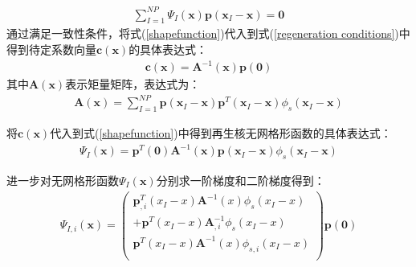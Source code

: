 \begin{equation}\label{regeneration conditions}
\begin{split}
    \sum_{I=1}^{N\!P}\Psi_I(\pmb{x})\pmb{p}(\pmb{x}_I-\pmb{x})=\pmb{0}
\end{split}
\end{equation}
通过满足一致性条件，将式(\ref{shapefunction})代入到式(\ref{regeneration conditions})中得到待定系数向量$\pmb{c}(\pmb{x})$的具体表达式：
\begin{equation}
\begin{split}
    \pmb{c}(\pmb{x})=\pmb{A}^{-1}(\pmb{x})\pmb{p}(\pmb{0})
\end{split}
\end{equation}
其中$\pmb{A}(\pmb{x})$表示矩量矩阵，表达式为：
\begin{equation}
\begin{split}
    \pmb{A}(\pmb{x})=\sum_{I=1}^{N\!P}\pmb{p}(\pmb{x}_I-\pmb{x})\pmb{p}^T(\pmb{x}_I-\pmb{x})\phi_s(\pmb{x}_I-\pmb{x})
\end{split}
\end{equation}\par
将$\pmb{c}(\pmb{x})$代入到式(\ref{shapefunction})中得到再生核无网格形函数的具体表达式：
\begin{equation}\label{Pshapefunction}
\begin{split}
    \Psi_I(\pmb{x})=\pmb{p}^T(\pmb{0})\pmb{A}^{-1}(\pmb{x})\pmb{p}(\pmb{x}_I-\pmb{x})\phi_s(\pmb{x}_I-\pmb{x})
\end{split}
\end{equation}\par
进一步对无网格形函数$\Psi_I(\pmb{x})$分别求一阶梯度和二阶梯度得到：
\begin{equation}
\begin{split}
    \Psi_{I,i}(\pmb{x})=\left(\begin{matrix}
    \pmb p_{,i}^{T}(x_I-x)\pmb A^{-1}(x)\phi_s(x_I-x)\\
    +\pmb p^{T}(x_I-x)\pmb A_{,i}^{-1}\phi_s(x_I-x)\\
    \pmb p^{T}(x_I-x)\pmb A^{-1}(x)\phi _{s,i}(x_I-x)\\
    \end{matrix}\right)
    \pmb p(\pmb 0)
\end{split}
\end{equation}
